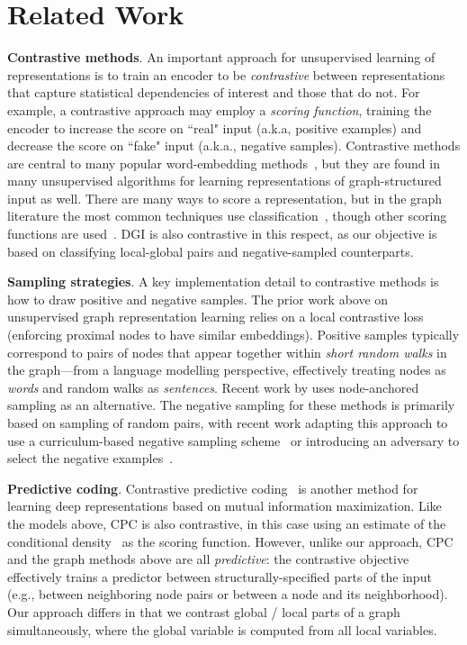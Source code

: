 \documentclass{article} \usepackage{iclr2019_conference,times}
\newcommand{\xhdr}[1]{{\noindent\bfseries #1}.}
\begin{document}
\section{Related Work}
\xhdr{Contrastive methods}
An important approach for unsupervised learning of representations is to train an encoder to be \emph{contrastive} between representations that capture statistical dependencies of interest and those that do not.
For example, a contrastive approach may employ a \emph{scoring function}, training the encoder to increase the score on ``real" input (a.k.a, positive examples) and decrease the score on ``fake" input (a.k.a., negative samples).
Contrastive methods are central to many popular word-embedding methods~\citep{collobert2008unified, mnih2013learning, mikolov2013distributed}, but they are found in many unsupervised algorithms for learning representations of graph-structured input as well.
There are many ways to score a representation, but in the graph literature the most common techniques use classification~\citep{perozzi2014deepwalk,grover2016node2vec,kipf2016variational,hamilton2017representation}, though other scoring functions are used~\citep{duran2017learning,bojchevski2018deep}.
DGI is also contrastive in this respect, as our objective is based on classifying local-global pairs and negative-sampled counterparts.

\xhdr{Sampling strategies}
A key implementation detail to contrastive methods is how to draw positive and negative samples.
The prior work above on unsupervised graph representation learning relies on a local contrastive loss (enforcing proximal nodes to have similar embeddings). Positive samples typically correspond to pairs of nodes that appear together within \emph{short random walks} in the graph---from a language modelling perspective, effectively treating nodes as \emph{words} and random walks as \emph{sentences}. Recent work by \cite{bojchevski2018deep} uses node-anchored sampling as an alternative.
The negative sampling for these methods is primarily based on sampling of random pairs, with recent work adapting this approach to use a curriculum-based negative sampling scheme~\citep[with progressively ``closer'' negative examples;][]{ying2018graph} or introducing an adversary to select the negative examples~\citep{bose2018adversarial}.

\xhdr{Predictive coding}
Contrastive predictive coding~\citep[CPC,][]{oord2018representation} is another method for learning deep representations based on mutual information maximization.
Like the models above, CPC is also contrastive, in this case using an estimate of the conditional density~\citep[in the form of noise contrastive estimation, ][]{gutmann2010noise} as the scoring function.
However, unlike our approach, CPC and the graph methods above are all \emph{predictive}: the contrastive objective effectively trains a predictor between structurally-specified parts of the input (e.g., between neighboring node pairs or between a node and its neighborhood). Our approach differs in that we contrast global / local parts of a graph simultaneously, where the global variable is computed from all local variables. 
\end{document}
